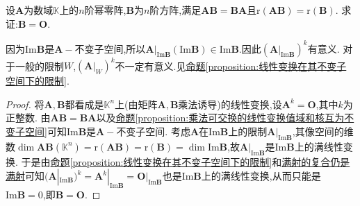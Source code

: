 \documentclass[lang=cn,newtx,10pt,scheme=chinese]{elegantbook}
\begin{document}
\begin{example}
设\(\boldsymbol{A}\)为数域\(\mathbb{K}\)上的\(n\)阶幂零阵,\(\boldsymbol{B}\)为\(n\)阶方阵,满足\(\boldsymbol{A}\boldsymbol{B}=\boldsymbol{B}\boldsymbol{A}\)且\(\text{r}(\boldsymbol{A}\boldsymbol{B})=\text{r}(\boldsymbol{B})\). 求证:\(\boldsymbol{B}=\boldsymbol{O}\).
\end{example}
\begin{remark}
因为$\text{Im}\boldsymbol{B}$是$\boldsymbol{A}-$不变子空间,所以\(\boldsymbol{A}|_{\text{Im}\boldsymbol{B}}(\text{Im}\boldsymbol{B})\in \text{Im}\boldsymbol{B}\).因此$(\boldsymbol{A}|_{\text{Im}\boldsymbol{B}})^k $有意义.
对于一般的限制$W$,$(\boldsymbol{A}|_{W})^k $不一定有意义.见\hyperref[proposition:线性变换在其不变子空间下的限制]{命题\ref{proposition:线性变换在其不变子空间下的限制}}.
\end{remark}
\begin{proof}
将\(\boldsymbol{A},\boldsymbol{B}\)都看成是\(\mathbb{K}^n\)上(由矩阵\(\boldsymbol{A},\boldsymbol{B}\)乘法诱导)的线性变换,设\(\boldsymbol{A}^k = \boldsymbol{O}\),其中\(k\)为正整数. 由\(\boldsymbol{A}\boldsymbol{B}=\boldsymbol{B}\boldsymbol{A}\)以及\hyperref[proposition:乘法可交换的线性变换值域和核互为不变子空间]{命题\ref{proposition:乘法可交换的线性变换值域和核互为不变子空间}}可知\(\text{Im}\boldsymbol{B}\)是\(\boldsymbol{A}-\)不变子空间. 考虑\(\boldsymbol{A}\)在\(\text{Im}\boldsymbol{B}\)上的限制\(\boldsymbol{A}|_{\text{Im}\boldsymbol{B}}\),其像空间的维数\(\dim\boldsymbol{A}\boldsymbol{B}(\mathbb{K}^n)=\text{r}(\boldsymbol{A}\boldsymbol{B})=\text{r}(\boldsymbol{B})=\dim\text{Im}\boldsymbol{B}\),故\(\boldsymbol{A}|_{\text{Im}\boldsymbol{B}}\)是\(\text{Im}\boldsymbol{B}\)上的满线性变换. 于是由\hyperref[proposition:线性变换在其不变子空间下的限制]{命题\ref{proposition:线性变换在其不变子空间下的限制}}和\hyperref[proposition:满射的复合仍是满射]{满射的复合仍是满射}可知\((\boldsymbol{A}|_{\text{Im}\boldsymbol{B}})^k = \boldsymbol{A}^k|_{\text{Im}\boldsymbol{B}}=\boldsymbol{O}|_{\text{Im}\boldsymbol{B}}\)也是\(\text{Im}\boldsymbol{B}\)上的满线性变换,从而只能是\(\text{Im}\boldsymbol{B}=0\),即\(\boldsymbol{B}=\boldsymbol{O}\). 
\end{proof}
\end{document}
